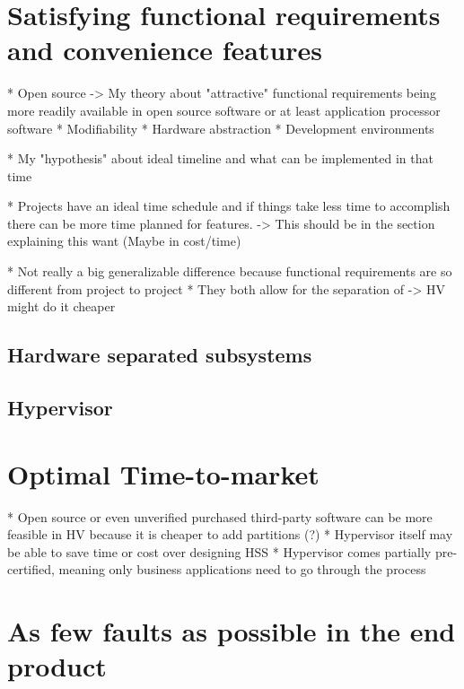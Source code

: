 
\section{Satisfying functional requirements and convenience features}

* Open source
	-> My theory about "attractive" functional requirements being more readily available in open source software or at least application processor software
* Modifiability
* Hardware abstraction
* Development environments

* My "hypothesis" about ideal timeline and what can be implemented in that time

* Projects have an ideal time schedule and if things take less time to accomplish there can be more time planned for features.
    -> This should be in the section explaining this want (Maybe in cost/time)
    
* Not really a big generalizable difference because functional requirements are so different from project to project
* They both allow for the separation of
    -> HV might do it cheaper 
\subsection{Hardware separated subsystems}
\subsection{Hypervisor}


\section{Optimal Time-to-market}
* Open source or even unverified purchased third-party software can be more feasible in HV because it is cheaper to add partitions (?)
* Hypervisor itself may be able to save time or cost over designing HSS
* Hypervisor comes partially pre-certified, meaning only business applications need to go through the process


\section{As few faults as possible in the end product}

